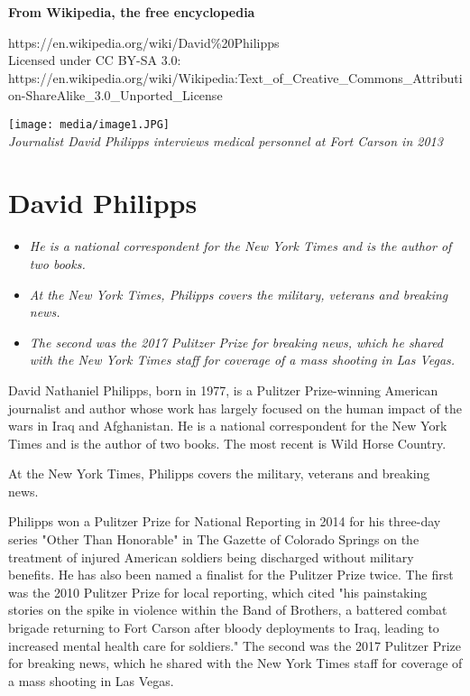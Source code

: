 \textbf{From Wikipedia, the free encyclopedia}

https://en.wikipedia.org/wiki/David\%20Philipps\\
Licensed under CC BY-SA 3.0:\\
https://en.wikipedia.org/wiki/Wikipedia:Text\_of\_Creative\_Commons\_Attribution-ShareAlike\_3.0\_Unported\_License

\texttt{[image: media/image1.JPG]}\\
\emph{Journalist David Philipps interviews medical personnel at Fort
Carson in 2013}

\section{David Philipps}\label{david-philipps}

\begin{itemize}
\item
  \emph{He is a national correspondent for the New York Times and is the
  author of two books.}
\item
  \emph{At the New York Times, Philipps covers the military, veterans
  and breaking news.}
\item
  \emph{The second was the 2017 Pulitzer Prize for breaking news, which
  he shared with the New York Times staff for coverage of a mass
  shooting in Las Vegas.}
\end{itemize}

David Nathaniel Philipps, born in 1977, is a Pulitzer Prize-winning
American journalist and author whose work has largely focused on the
human impact of the wars in Iraq and Afghanistan. He is a national
correspondent for the New York Times and is the author of two books. The
most recent is Wild Horse Country.

At the New York Times, Philipps covers the military, veterans and
breaking news.

Philipps won a Pulitzer Prize for National Reporting in 2014 for his
three-day series "Other Than Honorable" in The Gazette of Colorado
Springs on the treatment of injured American soldiers being discharged
without military benefits. He has also been named a finalist for the
Pulitzer Prize twice. The first was the 2010 Pulitzer Prize for local
reporting, which cited "his painstaking stories on the spike in violence
within the Band of Brothers, a battered combat brigade returning to Fort
Carson after bloody deployments to Iraq, leading to increased mental
health care for soldiers." The second was the 2017 Pulitzer Prize for
breaking news, which he shared with the New York Times staff for
coverage of a mass shooting in Las Vegas.

